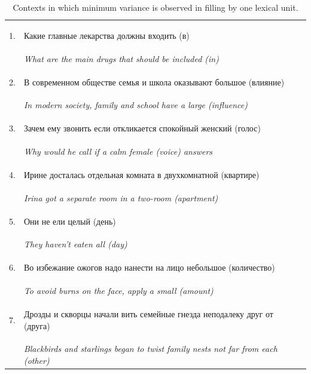 \documentclass[a4paper]{article}
\begin{document}
\begin{table}
\label{tbl:min-var}
\caption{Contexts in which minimum variance is observed in filling by one lexical unit.}
\centering

\vspace{0.5em}

\begin{tabular}{rl}
1. & \begin{russian} Какие главные лекарства должны входить (в)\end{russian} \\
& \textit{ What are the main drugs that should be included (in) } \\
2. & \begin{russian} В современном обществе семья и школа оказывают большое (влияние)\end{russian} \\
& \textit{ In modern society, family and school have a large (influence) } \\
3. & \begin{russian} Зачем ему звонить если откликается спокойный женский (голос)\end{russian} \\
& \textit{ Why would he call if a calm female (voice) answers } \\
4. & \begin{russian} Ирине досталась отдельная комната в двухкомнатной (квартире)\end{russian} \\
& \textit{ Irina got a separate room in a two-room (apartment) } \\
5. & \begin{russian} Они не ели целый (день)\end{russian} \\
& \textit{ They haven't eaten all (day) } \\
6. & \begin{russian} Во избежание ожогов надо нанести на лицо небольшое (количество)\end{russian} \\
& \textit{ To avoid burns on the face, apply a small (amount) } \\
7. & \begin{russian} Дрозды и скворцы начали вить семейные гнезда неподалеку друг от (друга)\end{russian} \\
& \textit{ Blackbirds and starlings began to twist family nests not far from each (other) } \\

\end{tabular}
\end{table}
\end{document}

